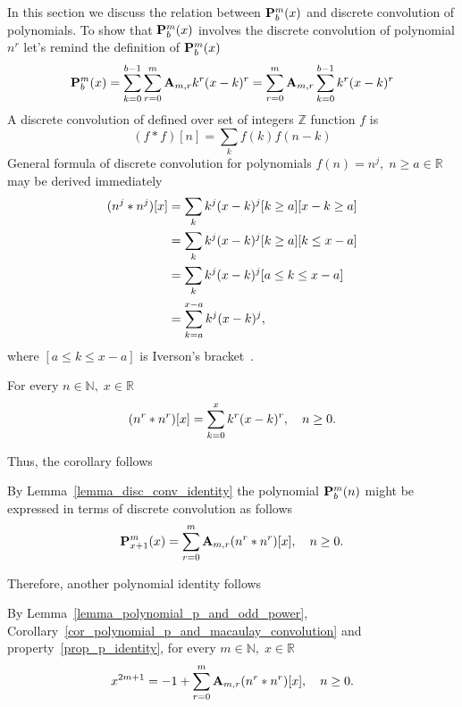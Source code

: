 In this section we discuss the relation between ${\mathbf{P}}\sp{m} \sb{b}(x)$ and discrete convolution of
polynomials.
To show that ${\mathbf{P}}\sp{m} \sb{b}(x)$ involves the discrete convolution of polynomial $n^r$
let's remind the definition of ${\mathbf{P}}\sp{m} \sb{b}(x)$
\begin{equation*}
    {\mathbf{P}}\sp{m} \sb{b}(x) = \sum_{k=0}^{b-1} \sum_{r=0}^{m} {\mathbf{A}} \sb{m,r} k^r (x-k)^r
    = \sum_{r=0}^{m} {\mathbf{A}} \sb{m,r} \sum_{k=0}^{b-1} k^r (x-k)^r
\end{equation*}
A discrete convolution of defined over set of integers $\mathbb{Z}$ function $f$ is
\begin{equation*}
(f \ast f)[n]
    = \sum_{k} f(k) f(n-k)
\end{equation*}
General formula of discrete convolution for polynomials $f(n) = n^j, \; n\geq a \in \mathbb{R}$ may be derived immediately
\begin{equation*}
    \begin{split}
        (n \sp{j} \ast n \sp{j}) [x]
        &=\sum_{k} k^j (x-k)^j [k\geq a][x-k\geq a] \\
        &=\sum_{k} k^j (x-k)^j [k\geq a][k\leq x-a] \\
        &=\sum_{k} k^j (x-k)^j [a \leq k \leq x-a] \\
        &=\sum_{k=a}^{x-a} k^j (x-k)^j,
    \end{split}
\end{equation*}
where $[a \leq k \leq x-a]$ is Iverson's bracket~\cite{APL}.
\begin{lem}
    \label{lemma_disc_conv_identity}
    For every $n\in\mathbb{N}, \; x\in\mathbb{R}$
    \[
        (n \sp{r} \ast n \sp{r}) [x] = \sum_{k=0}^{x} k^r (x-k)^r, \quad n\geq 0.
    \]
\end{lem}
Thus, the corollary follows
\begin{cor}
    \label{cor_polynomial_p_and_macaulay_convolution}
    By Lemma~\ref{lemma_disc_conv_identity} the polynomial ${\mathbf{P}}\sp{m} \sb{b}(n)$ might be expressed in terms
    of discrete convolution as follows
    \[
        {\mathbf{P}}\sp{m} \sb{x+1}(x) = \sum_{r=0}^{m} {\mathbf{A}} \sb{m,r} (n \sp{r} \ast n \sp{r}) [x], \quad n\geq 0.
    \]
\end{cor}
Therefore, another polynomial identity follows
\begin{thm}
    \label{thm_odd_power_by_macaulays_convolution}
    By Lemma~\ref{lemma_polynomial_p_and_odd_power}, Corollary~\ref{cor_polynomial_p_and_macaulay_convolution}
    and property~\ref{prop_p_identity}, for every $m\in\mathbb{N}, \; x\in\mathbb{R}$
    \begin{equation*}
        x^{2m+1} = -1 + \sum_{r=0}^{m} {\mathbf{A}} \sb{m,r} (n \sp{r} \ast n \sp{r}) [x], \quad n\geq 0.
    \end{equation*}
\end{thm}
